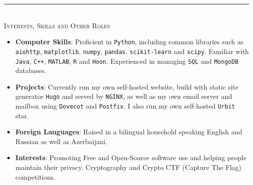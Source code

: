 \documentclass[10pt]{article}
\begin{document}
	\rule{\textwidth}{0.4pt}\\[0.2cm]
	\textsc{\Large Interests, Skills and Other Roles}
	\begin{itemize}[left=0pt]
		\item \textbf{Computer Skills}: Proficient in \texttt{Python}, including common libraries such as \texttt{aiohttp}, \texttt{matplotlib}, \texttt{numpy}, \texttt{pandas}, \texttt{scikit-learn} and \texttt{scipy}. Familiar with \texttt{Java}, \texttt{C++}, \texttt{MATLAB}, \texttt{R} and \texttt{Hoon}. Experienced in managing \texttt{SQL} and \texttt{MongoDB} databases.
		\item \textbf{Projects}: Currently run my own self-hosted website, build with static site generator \texttt{Hugo} and served by \texttt{NGINX}, as well as my own email server and mailbox using \texttt{Dovecot} and \texttt{Postfix}. I also run my own self-hosted \texttt{Urbit} star. 
		\item \textbf{Foreign Languages}: Raised in a bilingual household speaking English and Russian as well as Azerbaijani.
		\item \textbf{Interests}: Promoting Free and Open-Source software use and helping people maintain their privacy. Cryptography and Crypto CTF (Capture The Flag) competitions.
	\end{itemize}
\end{document}

